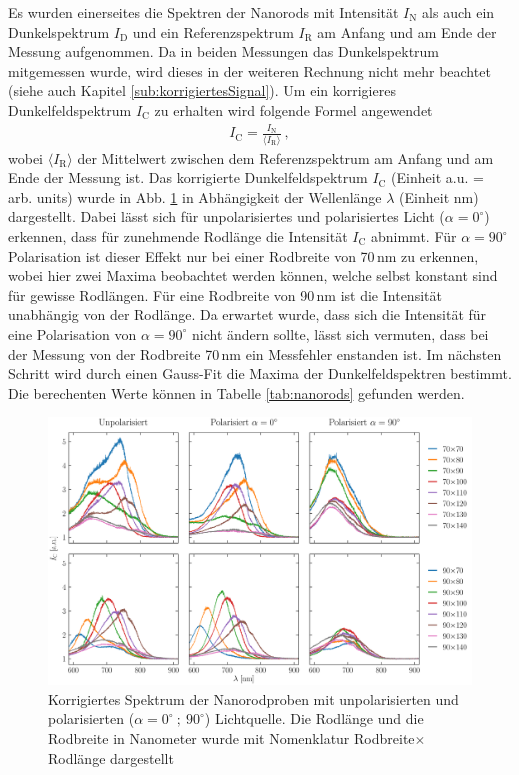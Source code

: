 Es wurden einerseites die Spektren der Nanorods mit Intensität $I_\mathrm{N}$ als auch ein Dunkelspektrum $I_\mathrm{D}$ und ein Referenzspektrum $I_\mathrm{R}$ am Anfang und am Ende der Messung aufgenommen. Da in beiden Messungen das Dunkelspektrum mitgemessen wurde, wird dieses in der weiteren Rechnung nicht mehr beachtet (siehe auch Kapitel \ref{sub:korrigiertesSignal}). Um ein korrigieres Dunkelfeldspektrum $I_\mathrm{C}$ zu erhalten wird folgende Formel angewendet
\begin{gather}
    I_\mathrm{C} = \frac{I_\mathrm{N}}{\langle I_\mathrm{R} \rangle} ~,
\end{gather}
wobei $\langle I_\mathrm{R} \rangle$ der Mittelwert zwischen dem Referenzspektrum am Anfang und am Ende der Messung ist. Das korrigierte Dunkelfeldspektrum $I_\mathrm{C}$ (Einheit a.u. = arb. units) wurde in Abb. \ref{fig:spektrum} in Abhängigkeit der Wellenlänge $\lambda$ (Einheit nm) dargestellt. Dabei lässt sich für unpolarisiertes und polarisiertes Licht ($\alpha = 0^\circ$) erkennen, dass für zunehmende Rodlänge die Intensität $I_\mathrm{C}$ abnimmt. Für $\alpha = 90^\circ$ Polarisation ist dieser Effekt nur bei einer Rodbreite von 70\,nm zu erkennen, wobei hier zwei Maxima beobachtet werden können, welche selbst konstant sind für gewisse Rodlängen. Für eine Rodbreite von 90\,nm ist die Intensität unabhängig von der Rodlänge. Da erwartet wurde, dass sich die Intensität für eine Polarisation von $\alpha = 90^\circ$ nicht ändern sollte, lässt sich vermuten, dass bei der Messung von der Rodbreite 70\,nm ein Messfehler enstanden ist. 
\bigskip
Im nächsten Schritt wird durch einen Gauss-Fit die Maxima der Dunkelfeldspektren bestimmt. Die berechenten Werte können in Tabelle \ref{tab:nanorods} gefunden werden.
\newpage
\begin{figure}
    \centering
    \includegraphics[width = \textheight]{Bilder/Auswertung/3.2/Spektren_Gruppe2.pdf}
    \caption{Korrigiertes Spektrum der Nanorodproben mit unpolarisierten und polarisierten ($\alpha = 0^\circ~;~90^\circ$) Lichtquelle. Die Rodlänge und die Rodbreite in Nanometer wurde mit Nomenklatur Rodbreite$\times$Rodlänge dargestellt}
    \label{fig:spektrum}
\end{figure}

